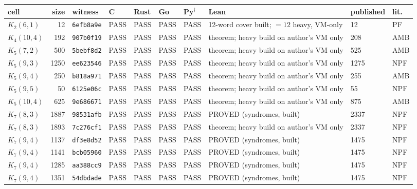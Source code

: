 \begin{table}[ht]
\centering
\scriptsize
\setlength{\tabcolsep}{3pt}
\begin{tabular}{@{}lrllllllll@{}}
\toprule
cell & size & witness & C & Rust & Go & Py$^\dagger$ & Lean & published & lit. \\
\midrule
$K_{2}(6,1)$ & 12 & \texttt{6efb8a9e} & PASS & PASS & PASS & PASS & 12-word cover built; $=12$ heavy, VM-only & 12 & PF \\
$K_{4}(10,4)$ & 192 & \texttt{907b0f19} & PASS & PASS & PASS & PASS & theorem; heavy build on author's VM only & 208 & AMB \\
$K_{5}(7,2)$ & 500 & \texttt{5bebf8d2} & PASS & PASS & PASS & PASS & theorem; heavy build on author's VM only & 525 & AMB \\
$K_{5}(9,3)$ & 1250 & \texttt{ee623546} & PASS & PASS & PASS & PASS & theorem; heavy build on author's VM only & 1275 & NPF \\
$K_{5}(9,4)$ & 250 & \texttt{b818a971} & PASS & PASS & PASS & PASS & theorem; heavy build on author's VM only & 255 & AMB \\
$K_{5}(9,5)$ & 50 & \texttt{6125e06c} & PASS & PASS & PASS & PASS & theorem; heavy build on author's VM only & 55 & NPF \\
$K_{5}(10,4)$ & 625 & \texttt{9e686671} & PASS & PASS & PASS & PASS & theorem; heavy build on author's VM only & 875 & AMB \\
$K_{7}(8,3)$ & 1887 & \texttt{98531afb} & PASS & PASS & PASS & PASS & PROVED (syndromes, built) & 2337 & NPF \\
$K_{7}(8,3)$ & 1893 & \texttt{7c276cf1} & PASS & PASS & PASS & PASS & theorem; heavy build on author's VM only & 2337 & NPF \\
$K_{7}(9,4)$ & 1137 & \texttt{df3e8d52} & PASS & PASS & PASS & PASS & PROVED (syndromes, built) & 1475 & NPF \\
$K_{7}(9,4)$ & 1141 & \texttt{bcb05960} & PASS & PASS & PASS & PASS & PROVED (syndromes, built) & 1475 & NPF \\
$K_{7}(9,4)$ & 1285 & \texttt{aa388cc9} & PASS & PASS & PASS & PASS & PROVED (syndromes, built) & 1475 & NPF \\
$K_{7}(9,4)$ & 1351 & \texttt{54dbdade} & PASS & PASS & PASS & PASS & PROVED (syndromes, built) & 1475 & NPF \\
\bottomrule
\end{tabular}

\end{table}

